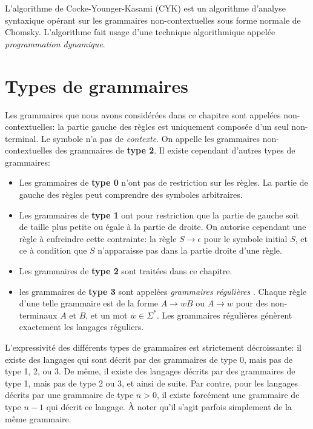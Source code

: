 L'algorithme de Cocke-Younger-Kasami (CYK) est un algorithme d'analyse syntaxique opérant sur les grammaires non-contextuelles sous forme normale de Chomsky. L'algorithme fait usage d'une technique algorithmique appelée \textit{programmation dynamique}.

\section{Types de grammaires}

Les grammaires que nous avons considérées dans ce chapitre sont appelées non-contextuelles:
la partie gauche des règles est uniquement composée d'un seul non-terminal.
Le symbole n'a pas de \textit{contexte}.
On appelle les grammaires non-contextuelles des grammaires de \textbf{type 2}.
Il existe cependant d'autres types de grammaires:
\begin{itemize}
\item Les grammaires de \textbf{type 0} n'ont pas de restriction sur les règles. La partie de gauche des règles peut comprendre des symboles arbitraires.
\item Les grammaires de \textbf{type 1} ont pour restriction que la partie de gauche soit de taille plus petite ou égale à la partie de droite.
On autorise cependant une règle à enfreindre cette contrainte: la règle $S \to \epsilon$ pour le symbole initial $S$, et ce à condition que $S$ n'apparaisse pas dans la partie droite d'une règle.
\item Les grammaires de \textbf{type 2} sont traitées dans ce chapitre.
\item les grammaires de \textbf{type 3} sont appelées \og \textit{grammaires régulières} \fg{}. Chaque règle d'une telle grammaire est de la forme $A \to wB$ ou $A \to w$ pour des non-terminaux $A$ et $B$, et un mot $w \in \Sigma^*$. Les grammaires régulières génèrent exactement les langages réguliers.
\end{itemize}
L'expressivité des différents types de grammaires est strictement décroissante:
il existe des langages qui sont décrit par des grammaires de type 0, mais pas de type 1, 2, ou 3.
De même, il existe des langages décrits par des grammaires de type 1, mais pas de type 2 ou 3, et ainsi de suite.
Par contre, pour les langages décrits par une grammaire de type $n > 0$, il existe forcément une grammaire de type $n - 1$ qui décrit ce langage.
À noter qu'il s'agit parfois simplement de la même grammaire.
